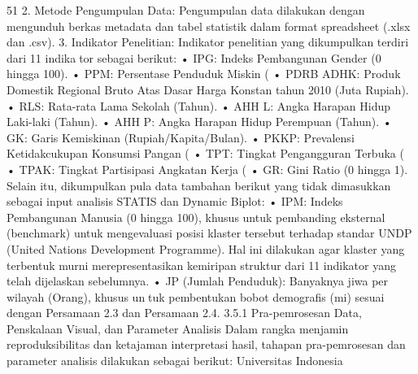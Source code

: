 51
2. Metode Pengumpulan Data: Pengumpulan data dilakukan dengan mengunduh
berkas metadata dan tabel statistik dalam format spreadsheet (.xlsx dan .csv).
3. Indikator Penelitian: Indikator penelitian yang dikumpulkan terdiri dari 11 indikator sebagai berikut:
• IPG: Indeks Pembangunan Gender (0 hingga 100).
• PPM: Persentase Penduduk Miskin (%
• PDRB ADHK: Produk Domestik Regional Bruto Atas Dasar Harga Konstan
tahun 2010 (Juta Rupiah).
• RLS: Rata-rata Lama Sekolah (Tahun).
• AHH L: Angka Harapan Hidup Laki-laki (Tahun).
• AHH P: Angka Harapan Hidup Perempuan (Tahun).
• GK: Garis Kemiskinan (Rupiah/Kapita/Bulan).
• PKKP: Prevalensi Ketidakcukupan Konsumsi Pangan (%
• TPT: Tingkat Pengangguran Terbuka (%
• TPAK: Tingkat Partisipasi Angkatan Kerja (%
• GR: Gini Ratio (0 hingga 1).
Selain itu, dikumpulkan pula data tambahan berikut yang tidak dimasukkan sebagai
input analisis STATIS dan Dynamic Biplot:
• IPM: Indeks Pembangunan Manusia (0 hingga 100), khusus untuk pembanding
eksternal (benchmark) untuk mengevaluasi posisi klaster tersebut terhadap
standar UNDP (United Nations Development Programme). Hal ini dilakukan
agar klaster yang terbentuk murni merepresentasikan kemiripan struktur dari
11 indikator yang telah dijelaskan sebelumnya.
• JP (Jumlah Penduduk): Banyaknya jiwa per wilayah (Orang), khusus untuk pembentukan bobot demografis (mi) sesuai dengan Persamaan 2.3 dan
Persamaan 2.4.
3.5.1 Pra-pemrosesan Data, Penskalaan Visual, dan Parameter Analisis
Dalam rangka menjamin reproduksibilitas dan ketajaman interpretasi hasil, tahapan
pra-pemrosesan dan parameter analisis dilakukan sebagai berikut:
Universitas Indonesia

